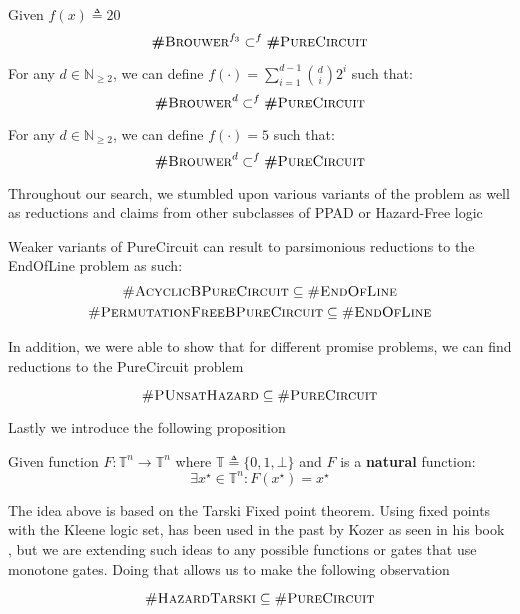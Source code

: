 \begin{theorem}
    Given $f(x) \triangleq 20$
    $$
    \textbf{\#}\textsc{Brouwer}^{f_3} \subset^f \textbf{\#}\textsc{PureCircuit}
    $$
\end{theorem}

\begin{corollary}
    For any $d \in \mathbb{N}_{\geq 2}$, we can define $f(\cdot) = \sum_{i = 1}^{d -1}  \binom{d}{i} 2^i$
    such that:
    $$
    \textbf{\#}\textsc{Brouwer}^{d} \subset^f \textbf{\#}\textsc{PureCircuit}
    $$ 
\end{corollary}



\begin{conjecture}
    For any $d \in \mathbb{N}_{\geq 2}$, we can define $f(\cdot) = 5$
    such that:
    $$
    \textbf{\#}\textsc{Brouwer}^{d} \subset^f \textbf{\#}\textsc{PureCircuit}
    $$ 
\end{conjecture}

Throughout our search, we stumbled upon
various variants of the problem as well as reductions and claims from other
subclasses of PPAD or Hazard-Free logic

\begin{proposition}
    Weaker variants of PureCircuit can result to parsimonious reductions to the EndOfLine problem
    as such:
    \begin{gather*}
        \textsc{\#AcyclicBPureCircuit} \subseteq \textsc{\#EndOfLine} \\
        \textsc{\#PermutationFreeBPureCircuit} \subseteq \textsc{\#EndOfLine}
    \end{gather*}
\end{proposition}


In addition, we were able to show that for different promise problems,
we can find reductions to the PureCircuit problem

\begin{proposition}
    $$
        \textsc{\#PUnsatHazard} \subseteq  \textsc{\#PureCircuit}
    $$
\end{proposition}

Lastly we introduce the following proposition
\begin{proposition}
    Given function $F: \mathbb{T}^n \to \mathbb{T}^n$
    where $\mathbb{T} \triangleq \{0, 1, \bot\}$ and $F$ is a \textbf{natural}
    function:
$$
\exists x^\star \in \mathbb{T}^n: F(x^\star) = x^\star
$$
\end{proposition}


The idea above is based on the Tarski Fixed point theorem.
Using fixed points with the Kleene logic set, has been used in the past
by Kozer as seen in his book \cite{kozen2006theory}, but we
are extending such ideas to any possible functions or gates
that use monotone gates. Doing that allows us to make the following observation

\begin{proposition}
    $$
    \textsc{\#HazardTarski} \subseteq \textsc{\#PureCircuit}
    $$
\end{proposition}
